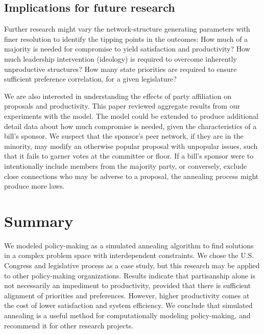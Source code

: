 \documentclass[pdftex,12pt,oribibl]{llncs}
\begin{document}
\subsection{Implications for future research}
Further research might vary the network-structure generating parameters with finer resolution to identify the tipping points in the outcomes:
How much of a majority is needed for compromise to yield satisfaction and productivity? 
How much leadership intervention (ideology) is required to overcome inherently unproductive structures?  
How many state priorities are required to ensure sufficient preference correlation, for a given legislature?

We are also interested in understanding the effects of party affiliation on proposals and productivity. This paper reviewed aggregate results from our experiments with the model.
The model could be extended to produce additional detail data about how much compromise is needed, given the characteristics of a bill's sponsor.
We suspect that the sponsor's peer network, if they are in the minority, may modify an otherwise popular proposal with unpopular issues, such that it fails to garner votes at the committee or floor. 
If a bill's sponsor were to intentionally include members from the majority party, or conversely, exclude close connections who may be adverse to a proposal, the annealing process might produce more laws.

\section{Summary}
We modeled policy-making as a simulated annealing algorithm to find solutions in a complex problem space with interdependent constraints.
We chose the U.S. Congress and legislative process as a case study, but this research may be applied to other policy-making organizations.
Results indicate that partisanship alone is not necessarily an impediment to productivity, provided that there is sufficient alignment of priorities and preferences.
However, higher productivity comes at the cost of lower satisfaction and system efficiency.
We conclude that simulated annealing is a useful method for computationally modeling policy-making, and recommend it for other research projects.
 
\end{document}
